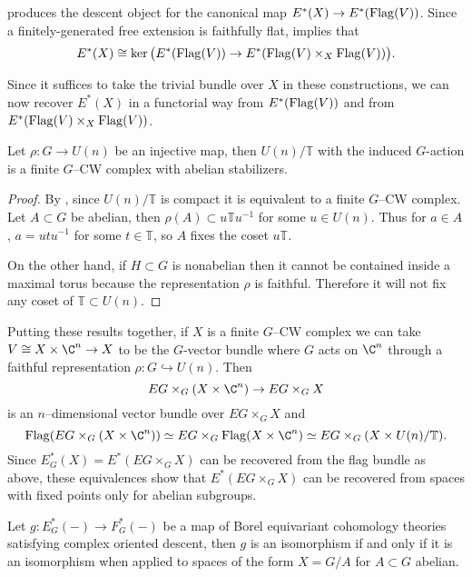 produces the descent object for the canonical map $E^*(X) \rightarrow E^*(\operatorname{Flag}(V))$. Since a finitely-generated free extension is faithfully flat,  implies that
\begin{equation*}
E^*(X) \cong \ker \big (E^*(\operatorname{Flag}(V)) \rightarrow E^*(\operatorname{Flag}(V) \times_X \operatorname{Flag}(V)) \big ).
\end{equation*}

Since it suffices to take the trivial bundle over $X$ in these constructions, we can now recover $E^*(X)$ in a functorial way from $E^*(\operatorname{Flag}(V))$ and from $E^*(\operatorname{Flag}(V) \times_X \operatorname{Flag}(V))$.

\begin{proposition}
Let $\rho \colon G \rightarrow U(n)$ be an injective map, then $U(n)/\mathbb{T}$ with the induced $G$-action is a finite $G$--CW complex with abelian stabilizers.
\end{proposition}
\begin{proof}
By , since $U(n)/\mathbb{T}$ is compact it is equivalent to a finite $G$--CW complex. Let $A \subset G$ be abelian, then $\rho(A) \subset u\mathbb{T}u^{-1}$ for some $u \in U(n)$. Thus for $a \in A$, $a = utu^{-1}$ for some $t \in \mathbb{T}$, so $A$ fixes the coset $u\mathbb{T}$.

On the other hand, if $H \subset G$ is nonabelian then it cannot be contained inside a maximal
torus because the representation $\rho$ is faithful. Therefore it will not fix any coset of $\mathbb{T} \subset U(n)$.
\end{proof}

Putting these results together, if $X$ is a finite $G$--CW complex we can take $V \cong X \times \C^n \rightarrow X$ to be the $G$-vector bundle where $G$ acts on $\C^n$ through a faithful representation $\rho \colon G \hookrightarrow U(n)$. Then 
\[
EG \times_G (X \times \C^n) \rightarrow EG \times_G X
\]
is an $n$--dimensional vector bundle over $EG \times_G X$ and
\[
\Flag(EG \times_G (X \times \C^n)) \simeq EG \times_G \Flag(X \times \C^n) \simeq EG \times_G (X \times U(n)/\mathbb{T}).
\]
Since $E^{*}_{G}(X) = E^*(EG \times_G X)$ can be recovered from the flag bundle as above, these equivalences show that $E^*(EG \times_G X)$ can be recovered from spaces with fixed points only for abelian subgroups. 

\begin{proposition} \label{codescent}
Let $g \colon E_{G}^*(-) \rightarrow F_{G}^*(-)$ be a map of Borel equivariant cohomology theories satisfying complex oriented descent, then $g$ is an isomorphism if and only if it is an isomorphism when applied to spaces of the form $X = G/A$ for $A \subset G$ abelian.
\end{proposition}

